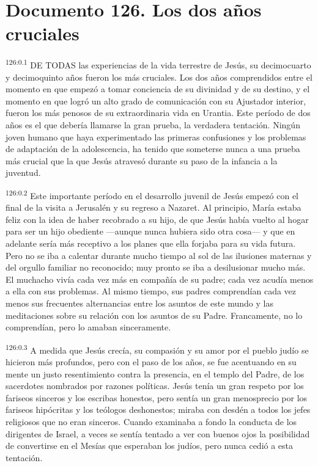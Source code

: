 \chapter{Documento 126. Los dos años cruciales}
\par
\textsuperscript{126:0.1} DE TODAS las experiencias de la vida terrestre de Jesús, su decimocuarto y decimoquinto años fueron los más cruciales. Los dos años comprendidos entre el momento en que empezó a tomar conciencia de su divinidad y de su destino, y el momento en que logró un alto grado de comunicación con su Ajustador interior, fueron los más penosos de su extraordinaria vida en Urantia. Este período de dos años es el que debería llamarse la gran prueba, la verdadera tentación. Ningún joven humano que haya experimentado las primeras confusiones y los problemas de adaptación de la adolescencia, ha tenido que someterse nunca a una prueba más crucial que la que Jesús atravesó durante su paso de la infancia a la juventud.

\par
\textsuperscript{126:0.2} Este importante período en el desarrollo juvenil de Jesús empezó con el final de la visita a Jerusalén y su regreso a Nazaret. Al principio, María estaba feliz con la idea de haber recobrado a su hijo, de que Jesús había vuelto al hogar para ser un hijo obediente ---aunque nunca hubiera sido otra cosa--- y que en adelante sería más receptivo a los planes que ella forjaba para su vida futura. Pero no se iba a calentar durante mucho tiempo al sol de las ilusiones maternas y del orgullo familiar no reconocido; muy pronto se iba a desilusionar mucho más. El muchacho vivía cada vez más en compañía de su padre; cada vez acudía menos a ella con sus problemas. Al mismo tiempo, sus padres comprendían cada vez menos sus frecuentes alternancias entre los asuntos de este mundo y las meditaciones sobre su relación con los asuntos de su Padre. Francamente, no lo comprendían, pero lo amaban sinceramente.

\par
\textsuperscript{126:0.3} A medida que Jesús crecía, su compasión y su amor por el pueblo judío se hicieron más profundos, pero con el paso de los años, se fue acentuando en su mente un justo resentimiento contra la presencia, en el templo del Padre, de los sacerdotes nombrados por razones políticas. Jesús tenía un gran respeto por los fariseos sinceros y los escribas honestos, pero sentía un gran menosprecio por los fariseos hipócritas y los teólogos deshonestos; miraba con desdén a todos los jefes religiosos que no eran sinceros. Cuando examinaba a fondo la conducta de los dirigentes de Israel, a veces se sentía tentado a ver con buenos ojos la posibilidad de convertirse en el Mesías que esperaban los judíos, pero nunca cedió a esta tentación.

